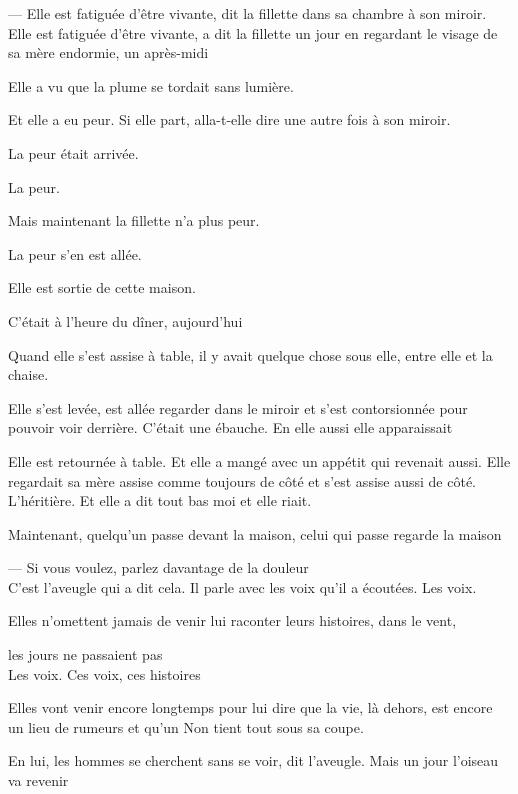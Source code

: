--- Elle est fatiguée d'être vivante, dit la fillette dans sa chambre à
son miroir. Elle est fatiguée d'être vivante, a dit la fillette un jour
en regardant le visage de sa mère endormie, un après-midi

Elle a vu que la plume se tordait sans lumière.

Et elle a eu peur. Si elle part, alla-t-elle dire une autre fois à son
miroir.

La peur était arrivée.

La peur.

Mais maintenant la fillette n'a plus peur.

La peur s'en est allée.

Elle est sortie de cette maison.

C'était à l'heure du dîner, aujourd'hui

Quand elle s'est assise à table, il y avait quelque chose sous elle,
entre elle et la chaise.

Elle s'est levée, est allée regarder dans le miroir et s'est
contorsionnée pour pouvoir voir derrière. C'était une ébauche. En elle
aussi elle apparaissait

Elle est retournée à table. Et elle a mangé avec un appétit qui revenait
aussi. Elle regardait sa mère assise comme toujours de côté et s'est
assise aussi de côté. L'héritière. Et elle a dit tout bas moi et elle
riait.

Maintenant, quelqu'un passe devant la maison, celui qui passe regarde la
maison

\breakk

\vspace*{4cm}

--- Si vous voulez, parlez davantage de la douleur\\

C'est l'aveugle qui a dit cela. Il parle avec les voix qu'il a écoutées.
Les voix.

Elles n'omettent jamais de venir lui raconter leurs histoires, dans le
vent,

les jours ne passaient pas\\

Les voix. Ces voix, ces histoires

Elles vont venir encore longtemps pour lui dire que la vie, là dehors,
est encore un lieu de rumeurs et qu'un Non tient tout sous sa coupe.

En lui, les hommes se cherchent sans se voir, dit l'aveugle. Mais un
jour l'oiseau va revenir

